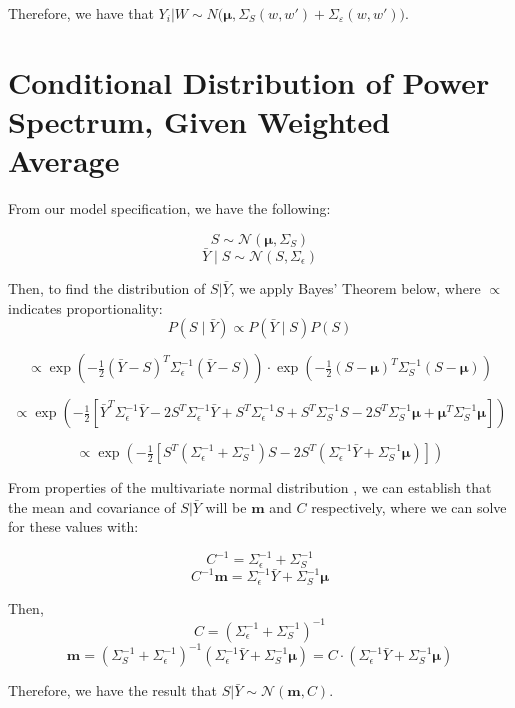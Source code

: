 \documentclass[11pt]{article}
\begin{document}
Therefore, we have that $Y_i|W \sim N\big(\boldsymbol{\mu}, \Sigma_S(w,w')+\Sigma_\varepsilon(w,w')\big)$.

\section{Conditional Distribution of Power Spectrum, Given Weighted Average}
\label{sec:apdx_SgivenY}

From our model specification, we have the following:

\[
S \sim \mathcal{N}(\boldsymbol{\mu}, \Sigma_S)
\]
\[
\bar{Y} \mid S \sim \mathcal{N}(S, \Sigma_\epsilon)
\]

Then, to find the distribution of $S|\bar{Y}$, we apply Bayes' Theorem below, 
where $\propto$ indicates proportionality:
\[
P(S \mid \bar{Y}) \propto P(\bar{Y} \mid S) P(S)
\]

\[
\propto \exp\left(-\tfrac{1}{2} (\bar{Y} - S)^T \Sigma_\epsilon^{-1} (\bar{Y} - S) \right) 
\cdot \exp\left(-\tfrac{1}{2} (S - \boldsymbol{\mu})^T \Sigma_S^{-1} (S - \boldsymbol{\mu})\right)
\]

\[
\propto \exp\left(-\tfrac{1}{2} \left[ \bar{Y}^T \Sigma_\epsilon^{-1} \bar{Y} 
- 2 S^T \Sigma_\epsilon^{-1} \bar{Y} + S^T \Sigma_\epsilon^{-1} S + S^T \Sigma_S^{-1} S 
- 2 S^T \Sigma_S^{-1} \boldsymbol{\mu} + \boldsymbol{\mu}^T \Sigma_S^{-1} \boldsymbol{\mu} \right] \right)
\]

\[
\propto \exp\left( -\tfrac{1}{2} \left[ S^T (\Sigma_\epsilon^{-1} + \Sigma_S^{-1}) S 
- 2 S^T (\Sigma_\epsilon^{-1} \bar{Y} + \Sigma_S^{-1} \boldsymbol{\mu}) \right] \right)
\]

From properties of the multivariate normal distribution \citep[e.g., Equation 7.1 of][]{hoff2009first},
we can establish that the mean and covariance of $S|\bar{Y}$ will be $\boldsymbol{m}$
and $C$ respectively, where we can solve for these values with:

\[
C^{-1} = \Sigma_\epsilon^{-1} + \Sigma_S^{-1}
\]
\[
C^{-1} \boldsymbol{m} = \Sigma_\epsilon^{-1} \bar{Y} + \Sigma_S^{-1} \boldsymbol{\mu}
\]

Then,
\[
C = (\Sigma_\epsilon^{-1} + \Sigma_S^{-1})^{-1}
\]
\[
\boldsymbol{m} = \left( \Sigma_S^{-1} + \Sigma_\epsilon^{-1} \right)^{-1} 
\left( \Sigma_\epsilon^{-1} \bar{Y} + \Sigma_S^{-1} \boldsymbol{\mu} \right)
= C \cdot \left( \Sigma_\epsilon^{-1} \bar{Y} + \Sigma_S^{-1} \boldsymbol{\mu} \right)
\]

Therefore, we have the result that $S|\bar{Y} \sim \mathcal{N}(\boldsymbol{m}, C)$.
\end{document}
